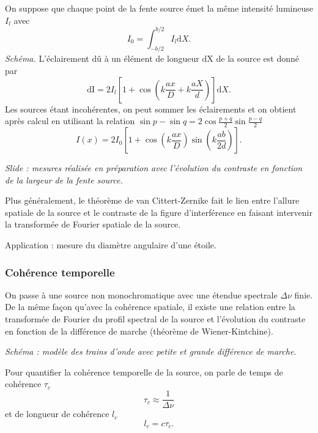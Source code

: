 On suppose que chaque point de la fente source émet la même intensité lumineuse $I_l$ avec
\begin{equation}
I_0 = \int_{-b/2}^{b/2} I_l \mathrm{d}X.
\end{equation}
\emph{Schéma.}
L'éclairement dû à un élément de longueur $\mathrm{dX}$ de la source est donné par
\begin{equation}
\mathrm{dI} = 2I_l\left[1+\cos\left(k\frac{ax}{D}+k\frac{aX}{d}\right)\right]\mathrm{d}X.
\end{equation}
Les sources étant incohérentes, on peut sommer les éclairements et on obtient après calcul en utilisant la relation $\sin p - \sin q = 2\cos\frac{p+q}{2}\sin\frac{p-q}{2}$
\begin{equation}
I(x) = 2I_0\left[1+\cos\left(k\frac{ax}{D}\right)\sin\left(k\frac{ab}{2d}\right)\right].
\end{equation}

\emph{Slide : mesures réalisée en préparation avec l'évolution du contraste en fonction de la largeur de la fente source.}

Plus généralement, le théorème de van Cittert-Zernike fait le lien entre l'allure spatiale de la source et le contraste de la figure d'interférence en faisant intervenir la transformée de Fourier spatiale de la source.

Application : mesure du diamètre angulaire d'une étoile.

\subsubsection{Cohérence temporelle}

On passe à une source non monochromatique avec une étendue spectrale $\Delta\nu$ finie.
De la même façon qu'avec la cohérence spatiale, il existe une relation entre la transformée de Fourier du profil spectral de la source et l'évolution du contraste en fonction de la différence de marche (théorème de Wiener-Kintchine).

\emph{Schéma : modèle des trains d'onde avec petite et grande différence de marche.}

Pour quantifier la cohérence temporelle de la source, on parle de temps de cohérence $\tau_c$
\begin{equation}
\tau_c \approx \frac{1}{\Delta\nu}
\end{equation}
et de longueur de cohérence $l_c$
\begin{equation}
l_c = c\tau_c.
\end{equation}

